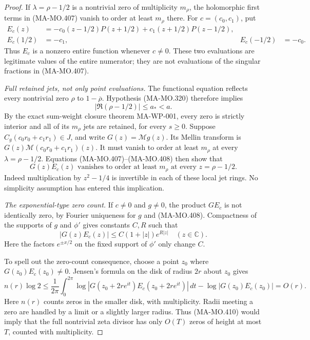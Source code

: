 \begin{proof}
If \(\lambda=\rho-1/2\) is a nontrivial zero of
multiplicity \(m_\rho\), the holomorphic first terms in
(MA-MO.407) vanish to order at least \(m_\rho\) there.
For \(c=(c_0,c_1)\), put
\[
 \begin{aligned}
 E_c(z)&=-c_0(z-1/2)P(z+1/2)
                       +c_1(z+1/2)P(z-1/2),\\
 E_c(1/2)&=-c_1,&E_c(-1/2)&=-c_0.
 \end{aligned}
 \tag{MA-MO.408}
\]
Thus \(E_c\) is a nonzero entire function whenever
\(c\ne0\). These two evaluations are legitimate values
of the entire numerator; they are not evaluations of the
singular fractions in (MA-MO.407).

\emph{Full retained jets, not only point evaluations.}
The functional equation reflects every nontrivial zero
\(\rho\) to \(1-\overline\rho\). Hypothesis (MA-MO.320)
therefore implies
\[
          |\Re(\rho-1/2)|\le a_*<a.
 \tag{MA-MO.409}
\]
By the exact sum-weight closure theorem MA-WP-001, every
zero is strictly interior and all of its
\(m_\rho\) jets are retained, for every \(s\ge0\).
Suppose \(C_g(c_0r_0+c_1r_1)\in J\), and write
\(G(z)=\mathcal Mg(z)\). Its Mellin transform is
\(G(z)\mathcal M(c_0r_0+c_1r_1)(z)\).
It must vanish to order at least \(m_\rho\) at every
\(\lambda=\rho-1/2\). Equations (MA-MO.407)--(MA-MO.408)
then show that
\[
                G(z)E_c(z)
   \text{ vanishes to order at least }m_\rho
                     \text{ at every }z=\rho-1/2.
 \tag{MA-MO.410}
\]
Indeed multiplication by \(z^2-1/4\) is invertible in
each of these local jet rings. No simplicity assumption
has entered this implication.

\emph{The exponential-type zero count.}
If \(c\ne0\) and \(g\ne0\), the product \(GE_c\)
is not identically zero, by Fourier uniqueness for \(g\)
and (MA-MO.408). Compactness of the supports of \(g\)
and \(\phi'\) gives constants \(C,R\) such that
\[
             |G(z)E_c(z)|\le C(1+|z|)e^{R|z|}
                                     \quad(z\in\mathbb C).
 \tag{MA-MO.411}
\]
Here the factors \(e^{\pm x/2}\) on the fixed support
of \(\phi'\) only change \(C\).

To spell out the zero-count consequence, choose a point
\(z_0\) where \(G(z_0)E_c(z_0)\ne0\). Jensen's formula
on the disk of radius \(2r\) about \(z_0\) gives
\[
 n(r)\log2
 \le\frac1{2\pi}\int_0^{2\pi}
       \log|G(z_0+2re^{it})E_c(z_0+2re^{it})|\,dt
           -\log|G(z_0)E_c(z_0)|=O(r).
 \tag{MA-MO.412}
\]
Here \(n(r)\) counts zeros in the smaller disk, with
multiplicity. Radii meeting a zero are handled by a limit
or a slightly larger radius. Thus (MA-MO.410) would imply
that the full nontrivial zeta divisor has only \(O(T)\)
zeros of height at most \(T\), counted with multiplicity.


\end{proof}
